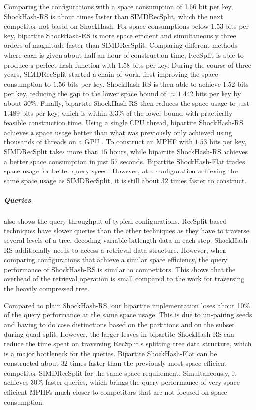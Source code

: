 \documentclass[a4paper,USenglish,cleveref]{lipics-v2021}
\newcommand{\myparagraph}[1]{\subparagraph*{#1}}
\def\ShockHashRS{ShockHash\nobreakdash-RS}
\begin{document}
Comparing the configurations with a space consumption of 1.56 bit per key, \ShockHashRS{} is about  times faster than SIMDRecSplit, which the next competitor not based on ShockHash.
For space consumptions below $1.53$ bits per key, bipartite ShockHash-RS is more space efficient and simultaneously three orders of magnitude faster than SIMDRecSplit.
Comparing different methods where each is given about half an hour of construction time, RecSplit is able to produce a perfect hash function with $1.58$ bits per key.
During the course of three years, SIMDRecSplit started a chain of work, first improving the space consumption to $1.56$ bits per key.
ShockHash-RS is then able to achieve $1.52$ bits per key, reducing the gap to the lower space bound of $\approx 1.442$ bits per key by about $30\%$.
Finally, bipartite ShockHash-RS then reduces the space usage to just $1.489$ bits per key, which is within $3.3$\% of the lower bound with practically feasible construction time.
Using a single CPU thread, bipartite ShockHash-RS achieves a space usage better than what was previously only achieved using thousands of threads on a GPU \cite{bez2023high}.
To construct an MPHF with $1.53$ bits per key, SIMDRecSplit takes more than $15$ hours, while bipartite ShockHash-RS achieves a better space consumption in just 57 seconds.
Bipartite ShockHash-Flat trades space usage for better query speed.
However, at a configuration achieving the same space usage as SIMDRecSplit, it is still about $32$ times faster to construct.

\myparagraph{Queries.}
 also shows the query throughput of typical configurations.
RecSplit-based techniques have slower queries than the other techniques as they have to traverse several levels of a tree, decoding variable-bitlength data in each step.
ShockHash-RS additionally needs to access a retrieval data structure.
However, when comparing configurations that achieve a similar space efficiency, the query performance of ShockHash-RS is similar to competitors.
This shows that the overhead of the retrieval operation is small compared to the work for traversing the heavily compressed tree.

Compared to plain ShockHash-RS, our bipartite implementation loses about 10\% of the query performance at the same space usage.
This is due to un-pairing seeds and having to do case distinctions based on the partitions and on the subset during quad split.
However, the larger leaves in bipartite ShockHash-RS can reduce the time spent on traversing RecSplit's splitting tree data structure, which is a major bottleneck for the queries.
Bipartite ShockHash-Flat can be constructed about $32$ times faster than the previously most space-efficient competitor SIMDRecSplit for the same space requirement.
Simultaneously, it achieves 30\% faster queries, which brings the query performance of very space efficient MPHFs much closer to competitors that are not focused on space consumption.
\end{document}
